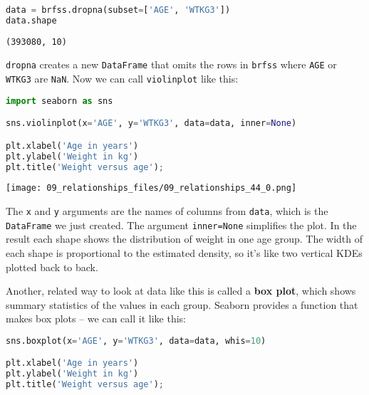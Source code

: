 \begin{lstlisting}[language=Python,style=source]
data = brfss.dropna(subset=['AGE', 'WTKG3'])
data.shape
\end{lstlisting}

\begin{lstlisting}[style=output]
(393080, 10)
\end{lstlisting}

\passthrough{\lstinline!dropna!} creates a new
\passthrough{\lstinline!DataFrame!} that omits the rows in
\passthrough{\lstinline!brfss!} where \passthrough{\lstinline!AGE!} or
\passthrough{\lstinline!WTKG3!} are \passthrough{\lstinline!NaN!}. Now
we can call \passthrough{\lstinline!violinplot!} like this:

\begin{lstlisting}[language=Python,style=source]
import seaborn as sns

sns.violinplot(x='AGE', y='WTKG3', data=data, inner=None)

plt.xlabel('Age in years')
plt.ylabel('Weight in kg')
plt.title('Weight versus age');
\end{lstlisting}

\begin{center}
\texttt{[image: 09\_relationships\_files/09\_relationships\_44\_0.png]}
\end{center}

The \passthrough{\lstinline!x!} and \passthrough{\lstinline!y!}
arguments are the names of columns from \passthrough{\lstinline!data!},
which is the \passthrough{\lstinline!DataFrame!} we just created. The
argument \passthrough{\lstinline!inner=None!} simplifies the plot. In
the result each shape shows the distribution of weight in one age group.
The width of each shape is proportional to the estimated density, so
it's like two vertical KDEs plotted back to back.

Another, related way to look at data like this is called a \textbf{box
plot}, which shows summary statistics of the values in each group.
Seaborn provides a function that makes box plots -- we can call it like
this:

\begin{lstlisting}[language=Python,style=source]
sns.boxplot(x='AGE', y='WTKG3', data=data, whis=10)

plt.xlabel('Age in years')
plt.ylabel('Weight in kg')
plt.title('Weight versus age');
\end{lstlisting}

